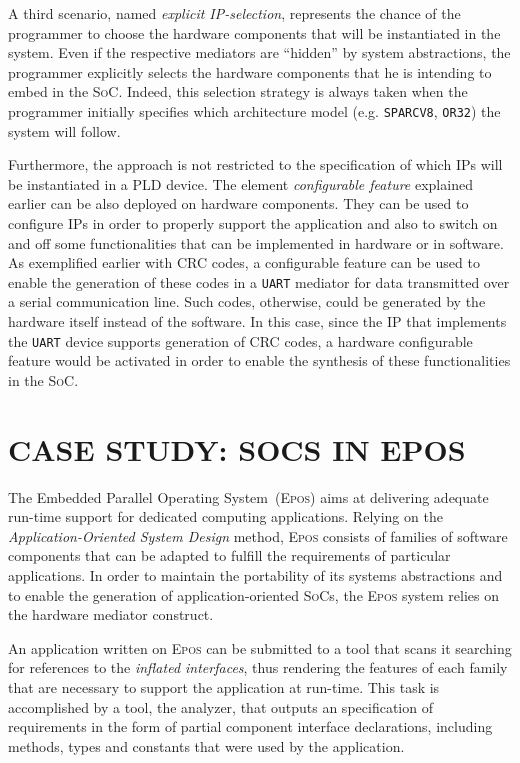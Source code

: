 \documentclass{kapproc} %
\begin{document}
 A third scenario, named \emph{explicit IP-selection}, represents the
 chance of the programmer to choose the hardware components that will
 be instantiated in the system. Even if the respective mediators are
 ``hidden'' by system abstractions, the programmer explicitly selects
 the hardware components that he is intending to embed in the
 \textsc{SoC}. Indeed, this selection strategy is always taken when
 the programmer initially specifies which architecture model
 (e.g. \texttt{SPARCV8}, \texttt{OR32}) the system will follow.

 Furthermore, the approach is not restricted to the specification of
 which \textsc{IP}s will be instantiated in a \textsc{PLD} device. The
 element \emph{configurable feature} explained earlier can be also
 deployed on hardware components. They can be used to configure
 \textsc{IP}s in order to properly support the application and also to
 switch on and off some functionalities that can be implemented in
 hardware or in software. As exemplified earlier with CRC codes, a
 configurable feature can be used to enable the generation of these
 codes in a \texttt{UART} mediator for data transmitted over a serial
 communication line. Such codes, otherwise, could be generated by the
 hardware itself instead of the software. In this case, since the
 \textsc{IP} that implements the \texttt{UART} device supports
 generation of CRC codes, a hardware configurable feature would be
 activated in order to enable the synthesis of these functionalities
 in the \textsc{SoC}.

\section[CASE STUDY: SOCS IN EPOS]
{CASE STUDY: SOCS IN EPOS\label{epos}} 

 The Embedded Parallel Operating System~(\textsc{Epos}) aims at
 delivering adequate run-time support for dedicated computing
 applications. Relying on the \emph{Application-Oriented System
 Design} method, \textsc{Epos} consists of families of software
 components that can be adapted to fulfill the requirements of
 particular applications. In order to maintain the portability of its
 systems abstractions and to enable the generation of
 application-oriented \textsc{SoC}s, the \textsc{Epos} system relies
 on the hardware mediator construct.

 An application written on \textsc{Epos} can be submitted to a tool
 that scans it searching for references to the \emph{inflated
 interfaces}, thus rendering the features of each family that are
 necessary to support the application at run-time. This task is
 accomplished by a tool, the analyzer, that outputs an specification
 of requirements in the form of partial component interface
 declarations, including methods, types and constants that were used
 by the application.
\end{document}
